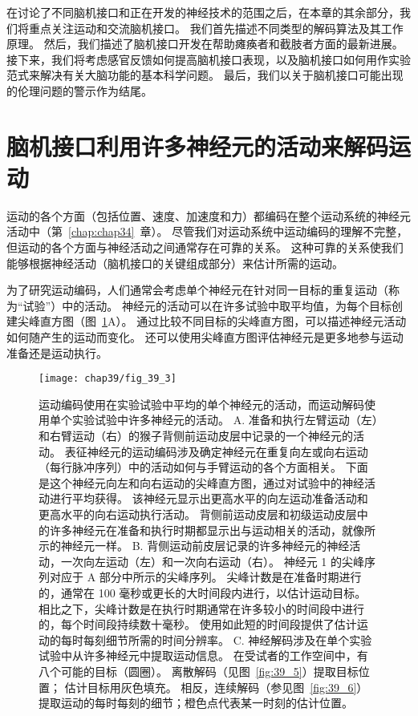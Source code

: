 在讨论了不同脑机接口和正在开发的神经技术的范围之后，在本章的其余部分，我们将重点关注运动和交流脑机接口。 
我们首先描述不同类型的解码算法及其工作原理。
然后，我们描述了脑机接口开发在帮助瘫痪者和截肢者方面的最新进展。 
接下来，我们将考虑感官反馈如何提高脑机接口表现，以及脑机接口如何用作实验范式来解决有关大脑功能的基本科学问题。
最后，我们以关于脑机接口可能出现的伦理问题的警示作为结尾。



\section{脑机接口利用许多神经元的活动来解码运动}

运动的各个方面（包括位置、速度、加速度和力）都编码在整个运动系统的神经元活动中（第~\ref{chap:chap34}~章）。
尽管我们对运动系统中运动编码的理解不完整，但运动的各个方面与神经活动之间通常存在可靠的关系。
这种可靠的关系使我们能够根据神经活动（脑机接口的关键组成部分）来估计所需的运动。


为了研究运动编码，人们通常会考虑单个神经元在针对同一目标的重复运动（称为“试验”）中的活动。
神经元的活动可以在许多试验中取平均值，为每个目标创建尖峰直方图（图~\ref{fig:39_3}A）。
通过比较不同目标的尖峰直方图，可以描述神经元活动如何随产生的运动而变化。
还可以使用尖峰直方图评估神经元是更多地参与运动准备还是运动执行。


\begin{figure}[htbp]
	\centering
	\texttt{[image: chap39/fig\_39\_3]}
	\caption{运动编码使用在实验试验中平均的单个神经元的活动，而运动解码使用单个实验试验中许多神经元的活动。
		A. 准备和执行左臂运动（左）和右臂运动（右）的猴子背侧前运动皮层中记录的一个神经元的活动。
		表征神经元的运动编码涉及确定神经元在重复向左或向右运动（每行脉冲序列）中的活动如何与手臂运动的各个方面相关。
		下面是这个神经元向左和向右运动的尖峰直方图，通过对试验中的神经活动进行平均获得。
		该神经元显示出更高水平的向左运动准备活动和更高水平的向右运动执行活动。
		背侧前运动皮层和初级运动皮层中的许多神经元在准备和执行时期都显示出与运动相关的活动，就像所示的神经元一样。
		B. 背侧运动前皮层记录的许多神经元的神经活动，一次向左运动（左）和一次向右运动（右）。
		神经元 1 的尖峰序列对应于 A 部分中所示的尖峰序列。
		尖峰计数是在准备时期进行的，通常在 100 毫秒或更长的大时间段内进行，以估计运动目标。
		相比之下，尖峰计数是在执行时期通常在许多较小的时间段中进行的，每个时间段持续数十毫秒。
		使用如此短的时间段提供了估计运动的每时每刻细节所需的时间分辨率。
		C. 神经解码涉及在单个实验试验中从许多神经元中提取运动信息。 在受试者的工作空间中，有八个可能的目标（圆圈）。
		离散解码（见图~\ref{fig:39_5}）提取目标位置； 估计目标用灰色填充。
		相反，连续解码（参见图~\ref{fig:39_6}）提取运动的每时每刻的细节；橙色点代表某一时刻的估计位置。}
	\label{fig:39_3}
\end{figure}




